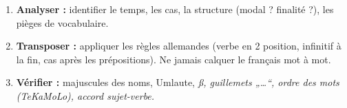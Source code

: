 \documentclass[11pt]{article}
\newcommand{\all}[1]{\ifmmode\text{\textit{#1}}\else\begingroup\selectlanguage{ngerman}\itshape #1\endgroup\fi}
\begin{document}
\begin{methode}
\begin{enumerate}
\item \textbf{Analyser :} identifier le temps, les cas, la structure (modal ? finalité ?), les pièges de vocabulaire.
\item \textbf{Transposer :} appliquer les règles allemandes (verbe en 2\ieme{} position, infinitif à la fin, cas après les prépositions). Ne jamais calquer le français mot à mot.
\item \textbf{Vérifier :} majuscules des noms, Umlaute, \all{ß}, guillemets „…“, ordre des mots (TeKaMoLo), accord sujet-verbe.
\end{enumerate}
\end{methode}
\end{document}
